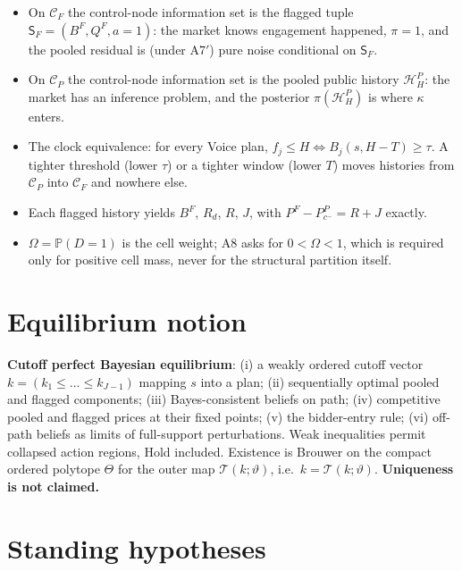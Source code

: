 \documentclass[11pt,a4paper]{article}
\newcommand{\Prb}{\mathbb{P}}
\newcommand{\Tmap}{\mathcal{T}}
\newcommand{\Sfl}{\mathsf{S}_F}
\begin{document}
\begin{itemize}
\item On $\mathcal C_F$ the control-node information set is the flagged tuple
  $\Sfl=(B^F,Q^F,a{=}1)$: the market knows engagement happened, $\pi=1$, and the
  pooled residual is (under A7$'$) pure noise conditional on $\Sfl$.
\item On $\mathcal C_P$ the control-node information set is the pooled public
  history $\mathcal H_H^P$: the market has an inference problem, and the posterior
  $\pi(\mathcal H_H^P)$ is where $\kappa$ enters.
\item The clock equivalence: for every Voice plan, $f_j\le H\iff B_j(s,H-T)\ge\tau$.
  A tighter threshold (lower $\tau$) or a tighter window (lower $T$) moves histories
  from $\mathcal C_P$ into $\mathcal C_F$ and nowhere else.
\item Each flagged history yields $B^F$, $R_d$, $R$, $J$, with
  $P^F-P_{c^-}^P=R+J$ exactly.
\item $\Omega=\Prb(D=1)$ is the cell weight; A8 asks for $0<\Omega<1$, which is
  required only for positive cell mass, never for the structural partition itself.
\end{itemize}

\section{Equilibrium notion}

\textbf{Cutoff perfect Bayesian equilibrium}: (i) a weakly ordered cutoff vector
$k=(k_1\le\dots\le k_{J-1})$ mapping $s$ into a plan; (ii) sequentially optimal
pooled and flagged components; (iii) Bayes-consistent beliefs on path; (iv)
competitive pooled and flagged prices at their fixed points; (v) the bidder-entry
rule; (vi) off-path beliefs as limits of full-support perturbations. Weak
inequalities permit collapsed action regions, Hold included. Existence is Brouwer on
the compact ordered polytope $\Theta$ for the outer map $\Tmap(k;\vartheta)$, i.e.\
$k=\Tmap(k;\vartheta)$. \textbf{Uniqueness is not claimed.}

\section{Standing hypotheses}
\label{sec:hyp}
\end{document}
